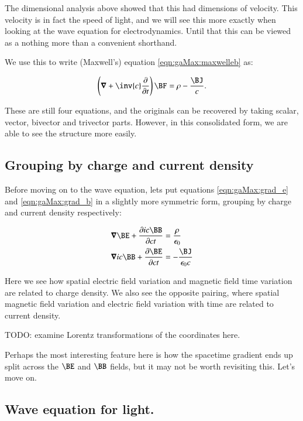 The dimensional analysis above showed that this had dimensions of velocity.  This velocity is in fact the speed of light, and
we will see this more exactly when looking at the wave equation for electrodynamics.  Until that this can be viewed as a
nothing more than a convenient shorthand.

We use this to write (Maxwell's) equation \ref{eqn:gaMax:maxwelleb} as:

\begin{equation}\label{eqn:gaMax:maxwellvs}
\left(\spacegrad + \inv{c}\frac{\partial}{\partial t} \right) \BF = \rho - \frac{\BJ}{c}.
\end{equation}

These are still four equations, and the originals can be recovered by taking scalar, vector, bivector and trivector parts.  However, in this
consolidated form, we are able to see the structure more easily.

\subsection{Grouping by charge and current density }

Before moving on to the wave equation, lets put equations \ref{eqn:gaMax:grad_e} and \ref{eqn:gaMax:grad_b} in a slightly more symmetric form,
grouping by charge and current density respectively:

\begin{align}
\spacegrad \BE + \frac{\partial ic\BB}{\partial ct} &= \frac{\rho}{\epsilon_0} \label{eqn:gaMax:gradE} \\
\spacegrad ic\BB + \frac{\partial \BE}{\partial ct} &= -\frac{\BJ}{\epsilon_0 c} \label{eqn:gaMax:gradB}
\end{align}

Here we see how spatial electric field variation and magnetic field time variation are related to charge density.  We also see the
opposite pairing, where 
spatial magnetic field variation and electric field variation with time are related to current density.

TODO: examine Lorentz transformations of the coordinates here.

Perhaps the most interesting feature here is how the spacetime gradient ends up split across the $\BE$ and $\BB$ fields, but 
it may not be worth revisiting this.  Let's move on.

\subsection{Wave equation for light. }

